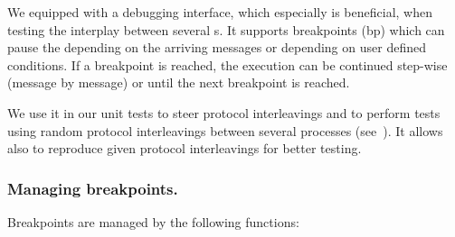 We equipped  with a debugging interface, which
especially is beneficial, when testing the interplay between several
s. It supports breakpoints (bp) which can pause the
 depending on the arriving messages or depending
on user defined conditions. If a breakpoint is reached, the execution can be
continued step-wise (message by message) or until the next breakpoint is
reached.

We use it in our unit tests to steer protocol interleavings and to perform
tests using random protocol interleavings between several processes
(see~). It allows also to reproduce given protocol
interleavings for better testing.

\subsubsection{Managing breakpoints.}

Breakpoints are managed by the following functions:


